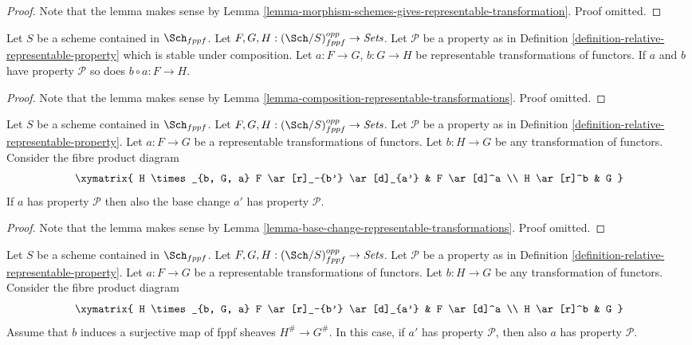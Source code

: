 \begin{proof}
Note that the lemma makes sense by
Lemma \ref{lemma-morphism-schemes-gives-representable-transformation}.
Proof omitted.
\end{proof}

\begin{lemma}
\label{lemma-composition-representable-transformations-property}
Let $S$ be a scheme contained in $\Sch_{fppf}$.
Let $F, G, H : (\Sch/S)_{fppf}^{opp} \to \textit{Sets}$.
Let $\mathcal{P}$ be a property as in
Definition \ref{definition-relative-representable-property}
which is stable under composition.
Let $a : F \to G$, $b : G \to H$ be representable transformations of functors.
If $a$ and $b$ have property $\mathcal{P}$ so does
$b \circ a : F \longrightarrow H$.
\end{lemma}

\begin{proof}
Note that the lemma makes sense by
Lemma \ref{lemma-composition-representable-transformations}.
Proof omitted.
\end{proof}

\begin{lemma}
\label{lemma-base-change-representable-transformations-property}
Let $S$ be a scheme contained in $\Sch_{fppf}$.
Let $F, G, H : (\Sch/S)_{fppf}^{opp} \to \textit{Sets}$.
Let $\mathcal{P}$ be a property as in
Definition \ref{definition-relative-representable-property}.
Let $a : F \to G$ be a representable transformations of functors.
Let $b : H \to G$ be any transformation of functors.
Consider the fibre product diagram
$$
\xymatrix{
H \times_{b, G, a} F \ar[r]_-{b'} \ar[d]_{a'} & F \ar[d]^a \\
H \ar[r]^b & G
}
$$
If $a$ has property $\mathcal{P}$ then also the base change $a'$
has property $\mathcal{P}$.
\end{lemma}

\begin{proof}
Note that the lemma makes sense by
Lemma \ref{lemma-base-change-representable-transformations}.
Proof omitted.
\end{proof}

\begin{lemma}
\label{lemma-descent-representable-transformations-property}
Let $S$ be a scheme contained in $\Sch_{fppf}$.
Let $F, G, H : (\Sch/S)_{fppf}^{opp} \to \textit{Sets}$.
Let $\mathcal{P}$ be a property as in
Definition \ref{definition-relative-representable-property}.
Let $a : F \to G$ be a representable transformations of functors.
Let $b : H \to G$ be any transformation of functors.
Consider the fibre product diagram
$$
\xymatrix{
H \times_{b, G, a} F \ar[r]_-{b'} \ar[d]_{a'} & F \ar[d]^a \\
H \ar[r]^b & G
}
$$
Assume that $b$ induces a surjective map of fppf sheaves $H^\# \to G^\#$.
In this case, if $a'$ has property $\mathcal{P}$, then also $a$
has property $\mathcal{P}$.
\end{lemma}

